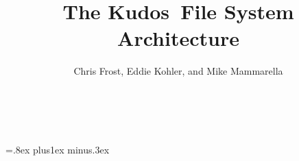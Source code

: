 \documentclass[10pt,twocolumn,letterpaper]{article}
\newcommand{\Kudos}{Kudos}
\begin{document}
\normalsize

\title{\sffamily\textbf{The \Kudos\ File System Architecture}}


\author{\sffamily Chris Frost, Eddie Kohler, and Mike Mammarella \\
\noalign{\vskip2pt}
 \\
\noalign{\vskip2pt}
 \\
\noalign{\vskip-.25in}
\null}
\date{}
\maketitle

\def\assast{\raise.2ex\hbox{$^\ast$}}























\begin{footnotesize}
\bibsep=.8ex plus1ex minus.3ex


\end{footnotesize}
\end{document}
